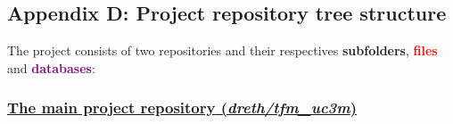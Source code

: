 \documentclass[
  a4paper]{article}
\begin{document}
\normalsize

\newpage

\hypertarget{AppendixD}{%
\subsection{Appendix D: Project repository tree
structure}\label{AppendixD}}


The project consists of two repositories and their respectives
\textcolor{darkspringgreen}{\textbf{subfolders}},
\textcolor{red}{\textbf{files}} and
\textcolor{purple}{\textbf{databases}}:

\hypertarget{the-main-project-repository-drethtfm_uc3m}{%
\subsubsection{\texorpdfstring{\href{https://github.com/dreth/tfm_uc3m}{\textbf{The
main project repository}
(\emph{dreth/tfm\_uc3m})}}{The main project repository (dreth/tfm\_uc3m)}}\label{the-main-project-repository-drethtfm_uc3m}}
\end{document}
